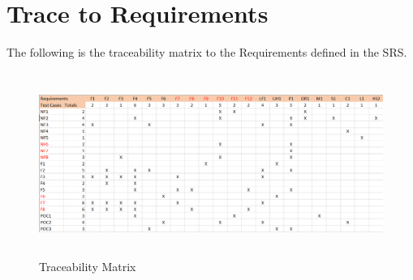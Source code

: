 \documentclass[12pt, titlepage]{article}
\begin{document}
		\newpage
\section{Trace to Requirements}
\noindent The following is the traceability matrix to the Requirements defined in the SRS.

\begin{figure}[h!]
\centering
\includegraphics[width = 14cm, height = 6cm]{TraceabilityMatrix}
\caption{Traceability Matrix}
\end{figure}
		
		\newpage
\end{document}
